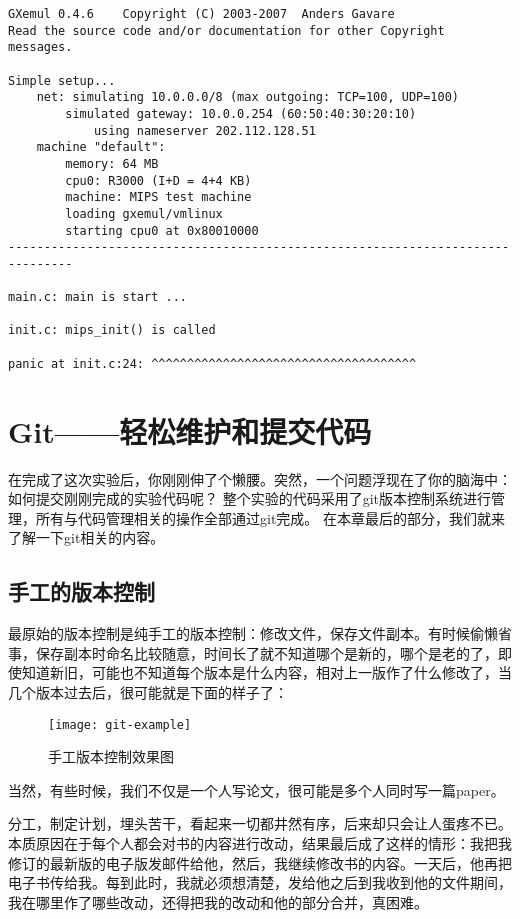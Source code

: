 \begin{verbatim}
GXemul 0.4.6    Copyright (C) 2003-2007  Anders Gavare
Read the source code and/or documentation for other Copyright messages.

Simple setup...
    net: simulating 10.0.0.0/8 (max outgoing: TCP=100, UDP=100)
        simulated gateway: 10.0.0.254 (60:50:40:30:20:10)
            using nameserver 202.112.128.51
    machine "default":
        memory: 64 MB
        cpu0: R3000 (I+D = 4+4 KB)
        machine: MIPS test machine
        loading gxemul/vmlinux
        starting cpu0 at 0x80010000
-------------------------------------------------------------------------------

main.c:	main is start ...

init.c:	mips_init() is called

panic at init.c:24: ^^^^^^^^^^^^^^^^^^^^^^^^^^^^^^^^^^^^^
\end{verbatim}

\section{Git——轻松维护和提交代码}

在完成了这次实验后，你刚刚伸了个懒腰。突然，一个问题浮现在了你的脑海中：如何提交刚刚完成的实验代码呢？
整个实验的代码采用了git版本控制系统进行管理，所有与代码管理相关的操作全部通过git完成。
在本章最后的部分，我们就来了解一下git相关的内容。

\subsection{手工的版本控制}

最原始的版本控制是纯手工的版本控制：修改文件，保存文件副本。有时候偷懒省事，保存副本时命名比较随意，时间长了就不知道哪个是新的，哪个是老的了，即使知道新旧，可能也不知道每个版本是什么内容，相对上一版作了什么修改了，当几个版本过去后，很可能就是下面的样子了：

\begin{figure}[htbp]
  \centering
  \texttt{[image: git-example]}
  \caption{手工版本控制效果图}\label{fig:git-example}
\end{figure}

当然，有些时候，我们不仅是一个人写论文，很可能是多个人同时写一篇paper。

分工，制定计划，埋头苦干，看起来一切都井然有序，后来却只会让人蛋疼不已。本质原因在于每个人都会对书的内容进行改动，结果最后成了这样的情形：我把我修订的最新版的电子版发邮件给他，然后，我继续修改书的内容。一天后，他再把电子书传给我。每到此时，我就必须想清楚，发给他之后到我收到他的文件期间，我在哪里作了哪些改动，还得把我的改动和他的部分合并，真困难。

